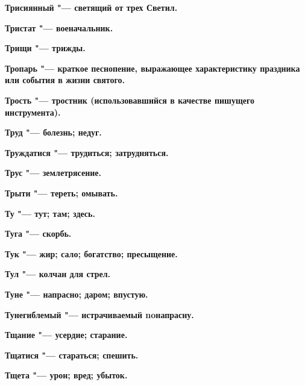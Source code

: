 \begin{mymulticols}{2}
\bfseries Трисиянный\normalfont{} "--- светящий от трех Светил. 




\bfseries Тристат\normalfont{} "--- военачальник. 




\bfseries Трищи\normalfont{} "--- трижды. 




\bfseries Тропарь\normalfont{} "--- краткое песнопение, выражающее характеристику праздника или события в жизни святого. 




\bfseries Трость\normalfont{} "--- тростник (использовавшийся в качестве пишущего инструмента). 




\bfseries Труд\normalfont{} "--- болезнь; недуг. 




\bfseries Труждатися\normalfont{} "--- трудиться; затрудняться. 




\bfseries Трус\normalfont{} "--- землетрясение. 




\bfseries Трыти\normalfont{} "--- тереть; омывать. 




\bfseries Ту\normalfont{} "--- тут; там; здесь. 




\bfseries Туга\normalfont{} "--- скорбь. 




\bfseries Тук\normalfont{} "--- жир; сало; богатство; пресыщение. 




\bfseries Тул\normalfont{} "--- колчан для стрел. 




\bfseries Туне\normalfont{} "--- напрасно; даром; впустую. 




\bfseries Тунегиблемый\normalfont{} "--- истрачиваемый noнапрасну. 




\bfseries Тщание\normalfont{} "--- усердие; старание. 




\bfseries Тщатися\normalfont{} "--- стараться; спешить. 




\bfseries Тщета\normalfont{} "--- урон; вред; убыток. 





\end{mymulticols}

